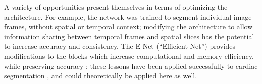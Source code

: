 A variety of opportunities present themselves in terms of optimizing the \omeganet{} architecture.
For example, the network was trained to segment individual image frames, without spatial or temporal context; modifying the architecture to allow information sharing between temporal frames and spatial slices has the potential to increase accuracy and consistency.
The E-Net (``Efficient Net'') provides modifications to the \UNet{} blocks which increase computational and memory efficiency, while preserving accuracy \citep{Paszke2016}; these lessons have been applied successfully to cardiac segmentation \citep{Lieman-Sifry2017}, and could theoretically be applied here as well.
